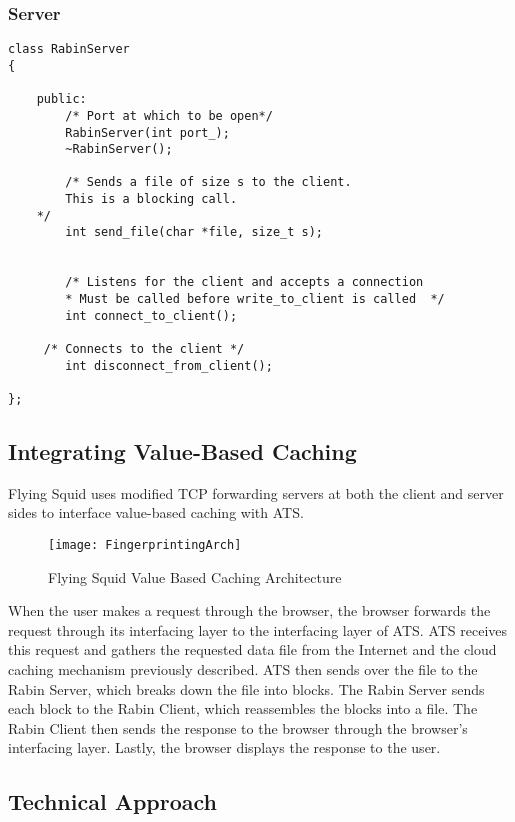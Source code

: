 \subsubsection{Server}

\begin{lstlisting}
class RabinServer
{

    public:
        /* Port at which to be open*/
        RabinServer(int port_);
        ~RabinServer();

        /* Sends a file of size s to the client.
		This is a blocking call.
	*/
        int send_file(char *file, size_t s); 


        /* Listens for the client and accepts a connection 
        * Must be called before write_to_client is called  */
        int connect_to_client();

	 /* Connects to the client */
        int disconnect_from_client();

};

\end{lstlisting}

\subsection{Integrating Value-Based Caching}

\noindent
Flying Squid uses modified TCP forwarding servers \cite{Partow} at both the client and server sides to interface value-based caching with ATS.

\begin{figure}[H] \centering
\texttt{[image: FingerprintingArch]}
\caption{Flying Squid Value Based Caching Architecture}
\end{figure}

\noindent
When the user makes a request through the browser, the browser forwards the request through its interfacing layer to the interfacing layer of ATS. ATS receives this request and gathers the requested data file from the Internet and the cloud caching mechanism previously described. ATS then sends over the file to the Rabin Server, which breaks down the file into blocks. The Rabin Server sends each block to the Rabin Client, which reassembles the blocks into a file. The Rabin Client then sends the response to the browser through the browser's interfacing layer. Lastly, the browser displays the response to the user. 

\subsection{Technical Approach}

